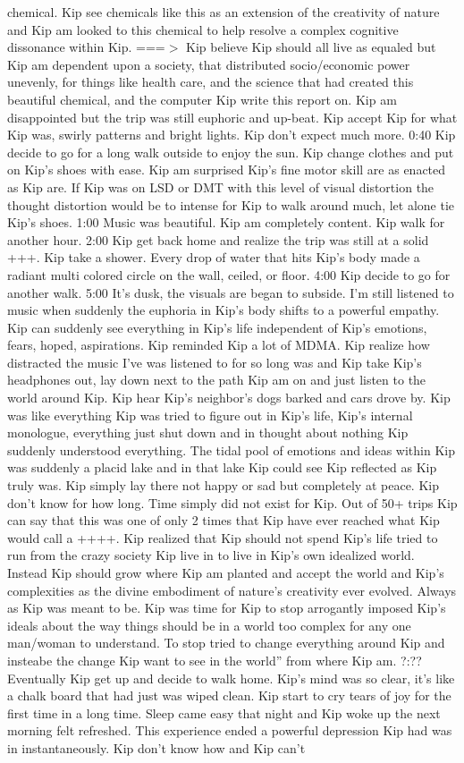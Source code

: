 \documentclass[12pt]{book}
\begin{document}
chemical. Kip see chemicals like this as an extension of the creativity of nature and Kip am looked to this chemical to help resolve a complex cognitive dissonance within Kip. ===$>$ Kip believe Kip should all live as equaled but Kip am dependent upon a society, that distributed socio/economic power unevenly, for things like health care, and the science that had created this beautiful chemical, and the computer Kip write this report on. Kip am disappointed but the trip was still euphoric and up-beat. Kip accept Kip for what Kip was, swirly patterns and bright lights. Kip don't expect much more. 0:40 Kip decide to go for a long walk outside to enjoy the sun. Kip change clothes and put on Kip's shoes with ease. Kip am surprised Kip's fine motor skill are as enacted as Kip are. If Kip was on LSD or DMT with this level of visual distortion the thought distortion would be to intense for Kip to walk around much, let alone tie Kip's shoes. 1:00 Music was beautiful. Kip am completely content. Kip walk for another hour. 2:00 Kip get back home and realize the trip was still at a solid +++. Kip take a shower. Every drop of water that hits Kip's body made a radiant multi colored circle on the wall, ceiled, or floor. 4:00 Kip decide to go for another walk. 5:00 It's dusk, the visuals are began to subside. I'm still listened to music when suddenly the euphoria in Kip's body shifts to a powerful empathy. Kip can suddenly see everything in Kip's life independent of Kip's emotions, fears, hoped, aspirations. Kip reminded Kip a lot of MDMA. Kip realize how distracted the music I've was listened to for so long was and Kip take Kip's headphones out, lay down next to the path Kip am on and just listen to the world around Kip. Kip hear Kip's neighbor's dogs barked and cars drove by. Kip was like everything Kip was tried to figure out in Kip's life, Kip's internal monologue, everything just shut down and in thought about nothing Kip suddenly understood everything. The tidal pool of emotions and ideas within Kip was suddenly a placid lake and in that lake Kip could see Kip reflected as Kip truly was. Kip simply lay there not happy or sad but completely at peace. Kip don't know for how long. Time simply did not exist for Kip. Out of 50+ trips Kip can say that this was one of only 2 times that Kip have ever reached what Kip would call a ++++. Kip realized that Kip should not spend Kip's life tried to run from the crazy society Kip live in to live in Kip's own idealized world. Instead Kip should grow where Kip am planted and accept the world and Kip's complexities as the divine embodiment of nature's creativity ever evolved. Always as Kip was meant to be. Kip was time for Kip to stop arrogantly imposed Kip's ideals about the way things should be in a world too complex for any one man/woman to understand. To stop tried to change everything around Kip and insteabe the change Kip want to see in the world'' from where Kip am. ?:?? Eventually Kip get up and decide to walk home. Kip's mind was so clear, it's like a chalk board that had just was wiped clean. Kip start to cry tears of joy for the first time in a long time. Sleep came easy that night and Kip woke up the next morning felt refreshed. This experience ended a powerful depression Kip had was in instantaneously. Kip don't know how and Kip can't 
\end{document}
